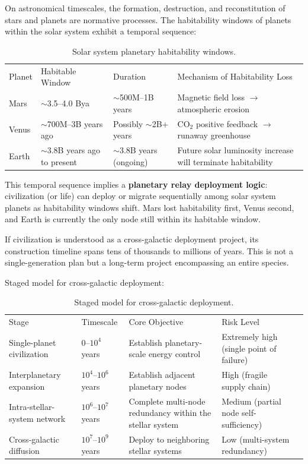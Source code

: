 \documentclass[aps,prd,twocolumn,superscriptaddress,nofootinbib]{revtex4-2}
\begin{document}
On astronomical timescales, the formation, destruction, and reconstitution of stars and planets are normative processes. The habitability windows of planets within the solar system exhibit a temporal sequence:

\begin{table}[htbp]
\caption{Solar system planetary habitability windows.}
\label{tab:habitability-windows}
\begin{ruledtabular}
\begin{tabular}{llll}
Planet & Habitable Window & Duration & Mechanism of Habitability Loss \\
\colrule
Mars & ${\sim}$3.5--4.0 Bya & ${\sim}$500M--1B years & Magnetic field loss $\to$ atmospheric erosion \\
Venus & ${\sim}$700M--3B years ago & Possibly ${\sim}$2B+ years & CO$_2$ positive feedback $\to$ runaway greenhouse \\
Earth & ${\sim}$3.8B years ago to present & ${\sim}$3.8B years (ongoing) & Future solar luminosity increase will terminate habitability \\
\end{tabular}
\end{ruledtabular}
\end{table}

This temporal sequence implies a \textbf{planetary relay deployment logic}: civilization (or life) can deploy or migrate sequentially among solar system planets as habitability windows shift. Mars lost habitability first, Venus second, and Earth is currently the only node still within its habitable window.

If civilization is understood as a cross-galactic deployment project, its construction timeline spans tens of thousands to millions of years. This is not a single-generation plan but a long-term project encompassing an entire species.

Staged model for cross-galactic deployment:

\begin{table}[htbp]
\caption{Staged model for cross-galactic deployment.}
\label{tab:deployment-stages}
\begin{ruledtabular}
\begin{tabular}{lllll}
Stage & Timescale & Core Objective & Risk Level \\
\colrule
Single-planet civilization & 0--$10^{4}$ years & Establish planetary-scale energy control & Extremely high (single point of failure) \\
Interplanetary expansion & $10^{4}$--$10^{6}$ years & Establish adjacent planetary nodes & High (fragile supply chain) \\
Intra-stellar-system network & $10^{6}$--$10^{7}$ years & Complete multi-node redundancy within the stellar system & Medium (partial node self-sufficiency) \\
Cross-galactic diffusion & $10^{7}$--$10^{9}$ years & Deploy to neighboring stellar systems & Low (multi-system redundancy) \\
\end{tabular}
\end{ruledtabular}
\end{table}
\end{document}
